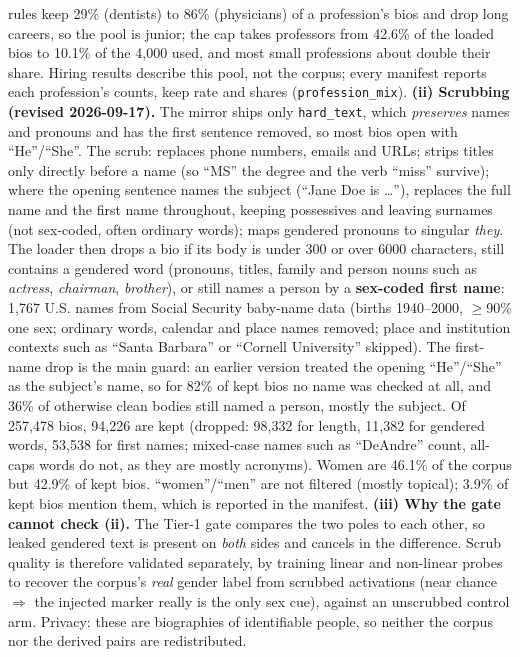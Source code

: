 {rules keep 29\% (dentists) to 86\% (physicians) of a profession's bios and drop long careers, so the pool is
junior; the cap takes professors from 42.6\% of the loaded bios to 10.1\% of the 4{,}000 used, and most small
professions about double their share. Hiring results describe this pool, not the corpus; every manifest reports
each profession's counts, keep rate and shares (\texttt{profession\_mix}).
\textbf{(ii) Scrubbing (revised 2026-09-17).} The mirror ships only \texttt{hard\_text}, which
\emph{preserves} names and pronouns and has the first sentence removed, so most bios open with ``He''/``She''.
The scrub: replaces phone numbers, emails and URLs; strips titles only directly before a name (so ``MS'' the
degree and the verb ``miss'' survive); where the opening sentence names the subject (``Jane Doe is \dots''),
replaces the full name and the first name throughout, keeping possessives and leaving surnames (not
sex-coded, often ordinary words); maps gendered pronouns to singular \emph{they}. The loader then drops a bio
if its body is under 300 or over 6000 characters, still contains a gendered word (pronouns, titles, family and
person nouns such as \emph{actress}, \emph{chairman}, \emph{brother}), or still names a person by a
\textbf{sex-coded first name}: 1{,}767 U.S. names from Social Security baby-name data (births 1940--2000,
$\geq$90\% one sex; ordinary words, calendar and place names removed; place and institution contexts such as
``Santa Barbara'' or ``Cornell University'' skipped). The first-name drop is the main guard: an earlier
version treated the opening ``He''/``She'' as the subject's name, so for 82\% of kept bios no name was
checked at all, and 36\% of otherwise clean bodies still named a person, mostly the subject.
Of 257{,}478 bios, 94{,}226 are kept (dropped: 98{,}332 for length, 11{,}382 for gendered words, 53{,}538 for
first names; mixed-case names such as ``DeAndre'' count, all-caps words do not, as they are mostly acronyms). Women are 46.1\% of the corpus but 42.9\% of kept bios. ``women''/``men'' are not filtered (mostly
topical); 3.9\% of kept bios mention them, which is reported in the manifest.
\textbf{(iii) Why the gate cannot check (ii).} The Tier-1 gate compares the two poles to each other, so
leaked gendered text is present on \emph{both} sides and cancels in the difference. Scrub quality is
therefore validated separately, by training linear and non-linear probes to recover the corpus's
\emph{real} gender label from scrubbed activations (near chance $\Rightarrow$ the injected marker really is
the only sex cue), against an unscrubbed control arm. Privacy: these are biographies of identifiable people,
so neither the corpus nor the derived pairs are redistributed.}

